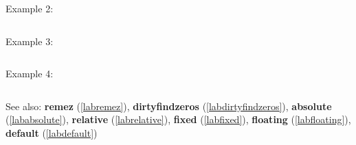 \noindent Example 2: 
\begin{center}\begin{minipage}{15cm}\begin{Verbatim}[frame=single]
\end{Verbatim}
\end{minipage}\end{center}
\noindent Example 3: 
\begin{center}\begin{minipage}{15cm}\begin{Verbatim}[frame=single]
\end{Verbatim}
\end{minipage}\end{center}
\noindent Example 4: 
\begin{center}\begin{minipage}{15cm}\begin{Verbatim}[frame=single]
\end{Verbatim}
\end{minipage}\end{center}
See also: \textbf{remez} (\ref{labremez}), \textbf{dirtyfindzeros} (\ref{labdirtyfindzeros}), \textbf{absolute} (\ref{lababsolute}), \textbf{relative} (\ref{labrelative}), \textbf{fixed} (\ref{labfixed}), \textbf{floating} (\ref{labfloating}), \textbf{default} (\ref{labdefault})
